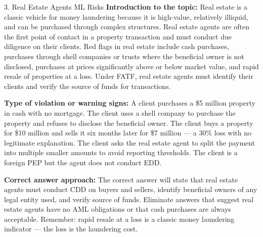\documentclass[11pt,a4paper]{beamer}
\begin{document}
\begin{frame}{3. Real Estate Agents ML Risks}
\tiny
\noindent\textbf{Introduction to the topic:} Real estate is a classic vehicle for money laundering because it is high-value, relatively illiquid, and can be purchased through complex structures. Real estate agents are often the first point of contact in a property transaction and must conduct due diligence on their clients. Red flags in real estate include cash purchases, purchases through shell companies or trusts where the beneficial owner is not disclosed, purchases at prices significantly above or below market value, and rapid resale of properties at a loss. Under FATF, real estate agents must identify their clients and verify the source of funds for transactions.

\vspace{0.1cm}
\noindent\textbf{Type of violation or warning signs:} A client purchases a \$5 million property in cash with no mortgage. The client uses a shell company to purchase the property and refuses to disclose the beneficial owner. The client buys a property for \$10 million and sells it six months later for \$7 million — a 30\% loss with no legitimate explanation. The client asks the real estate agent to split the payment into multiple smaller amounts to avoid reporting thresholds. The client is a foreign PEP but the agent does not conduct EDD.

\vspace{0.1cm}
\noindent\textbf{Correct answer approach:} The correct answer will state that real estate agents must conduct CDD on buyers and sellers, identify beneficial owners of any legal entity used, and verify source of funds. Eliminate answers that suggest real estate agents have no AML obligations or that cash purchases are always acceptable. Remember: rapid resale at a loss is a classic money laundering indicator — the loss is the laundering cost.
\end{frame}
\end{document}
